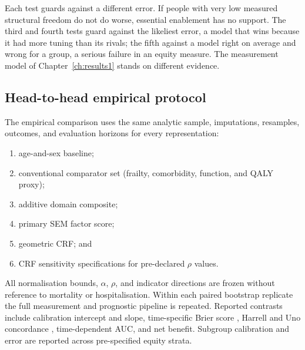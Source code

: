 Each test guards against a different error. If people with very low measured
structural freedom do not do worse, essential enablement has no support. The
third and fourth tests guard against the likeliest error, a model that wins
because it had more tuning than its rivals; the fifth against a model right on
average and wrong for a group, a serious failure in an equity measure. The
measurement model of Chapter~\ref{ch:results1} stands on different evidence.

\subsection{Head-to-head empirical protocol}
The empirical comparison uses the same analytic sample, imputations, resamples,
outcomes, and evaluation horizons for every representation:
\begin{enumerate}
 \item age-and-sex baseline;
 \item conventional comparator set (frailty, comorbidity, function, and QALY
 proxy);
 \item additive domain composite;
 \item primary SEM factor score;
 \item geometric CRF; and
 \item CRF sensitivity specifications for pre-declared $\rho$ values.
\end{enumerate}
All normalisation bounds, $\alpha$, $\rho$, and indicator directions are frozen
without reference to mortality or hospitalisation. Within each paired bootstrap
replicate the full measurement and prognostic pipeline is repeated. Reported
contrasts include calibration intercept and slope, time-specific Brier score \citep{brier_1950},
Harrell and Uno concordance \citep{uno_2011}, time-dependent AUC, and net benefit. Subgroup
calibration and error are reported across pre-specified equity strata.

